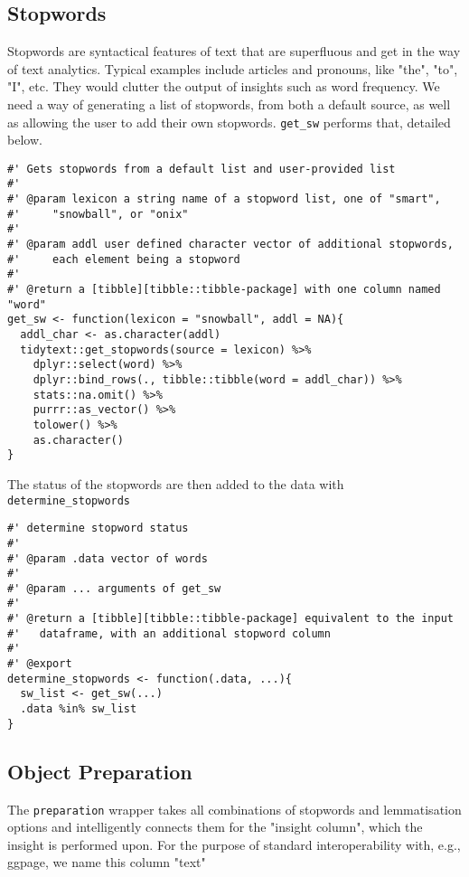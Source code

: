 \documentclass[a4paper, 11pt]{article}
\begin{document}
\subsection{Stopwords}
\label{sec:org53c76c4}
Stopwords are syntactical features of text that are superfluous and
get in the way of text analytics. Typical examples include articles
and pronouns, like "the", "to", "I", etc. They would clutter the
output of insights such as word frequency. We need a way of generating
a list of stopwords, from both a default source, as well as allowing
the user to add their own stopwords. \texttt{get\_sw} performs that, detailed
below.
\begin{verbatim}
#' Gets stopwords from a default list and user-provided list
#'
#' @param lexicon a string name of a stopword list, one of "smart",
#'     "snowball", or "onix"
#'
#' @param addl user defined character vector of additional stopwords,
#'     each element being a stopword
#'
#' @return a [tibble][tibble::tibble-package] with one column named "word"
get_sw <- function(lexicon = "snowball", addl = NA){
  addl_char <- as.character(addl)
  tidytext::get_stopwords(source = lexicon) %>%
    dplyr::select(word) %>%
    dplyr::bind_rows(., tibble::tibble(word = addl_char)) %>%
    stats::na.omit() %>%
    purrr::as_vector() %>%
    tolower() %>%
    as.character()
}
\end{verbatim}
The status of the stopwords are then added to the data with \texttt{determine\_stopwords}
\begin{verbatim}
#' determine stopword status
#'
#' @param .data vector of words
#'
#' @param ... arguments of get_sw
#'
#' @return a [tibble][tibble::tibble-package] equivalent to the input
#'   dataframe, with an additional stopword column
#'
#' @export
determine_stopwords <- function(.data, ...){
  sw_list <- get_sw(...)
  .data %in% sw_list
}
\end{verbatim}
\subsection{Object Preparation}
\label{sec:orgaa12f95}
The \texttt{preparation} wrapper takes all combinations of stopwords and
lemmatisation options and intelligently connects them for the "insight
column", which the insight is performed upon. For the purpose of
standard interoperability with, e.g., ggpage, we name this column
"text"
\end{document}
